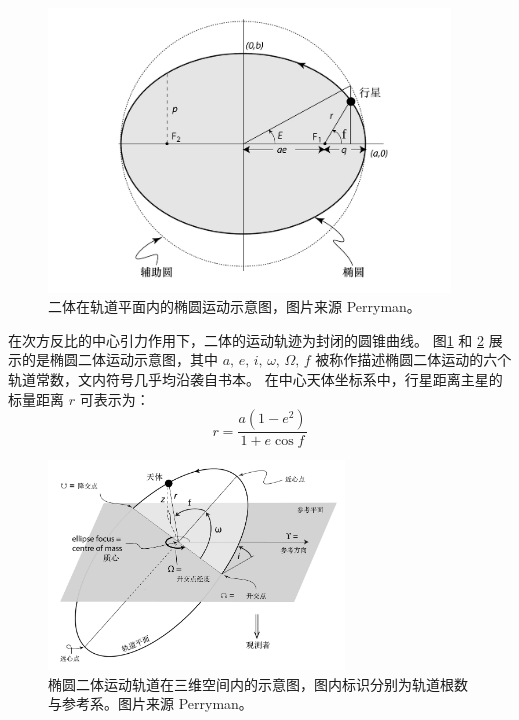 \begin{figure}[h]
\centering
\includegraphics[width=0.95\textwidth]{figures/appendix/f1_ellipse.pdf}
\caption{二体在轨道平面内的椭圆运动示意图，图片来源 Perryman。}
\label{fig:ellipse}
\end{figure}

在次方反比的中心引力作用下，二体的运动轨迹为封闭的圆锥曲线\cite{Newton1687}。
图\ref{fig:ellipse} 和 \ref{fig:3dorbit} 展示的是椭圆二体运动示意图，其中 $a,\,e,\,i,\,\omega,\,\Omega,\,f$ 
被称作描述椭圆二体运动的六个轨道常数，文内符号几乎均沿袭自书本。
在中心天体坐标系中，行星距离主星的标量距离 $r$ 可表示为：
\begin{equation} \label{radialdistance}
r = \frac{a(1-e^2)}{1+e\cos f}
\end{equation} 

\begin{figure}[t]
\centering
\includegraphics[width=0.70\textwidth]{figures/appendix/f2_3dorbit.pdf}
\caption{椭圆二体运动轨道在三维空间内的示意图，图内标识分别为轨道根数与参考系。图片来源 Perryman。}
\label{fig:3dorbit}
\end{figure}

